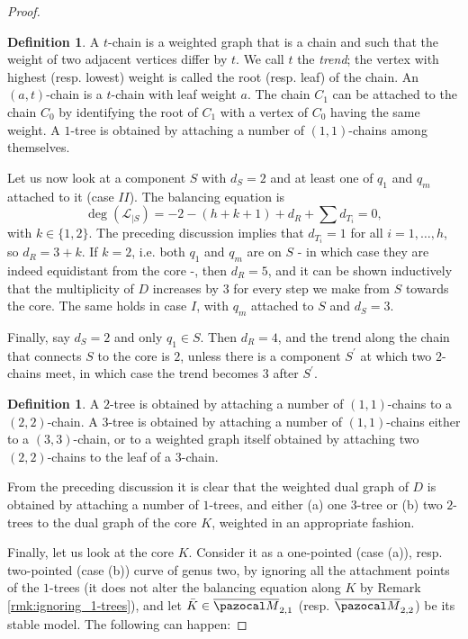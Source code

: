 \documentclass[11pt]{amsart}
\newcommand{\oM}{\overline{\pazocal M}}
\theoremstyle{plain}
\theoremstyle{definition}
\newtheorem{dfn}[thm]{Definition}
\begin{document}
\begin{proof}
\begin{dfn}
 A $t$-chain is a weighted graph that is a chain and such that the weight of two adjacent vertices differ by $t$. We call $t$ the \emph{trend}; the vertex with highest (resp. lowest) weight is called the root (resp. leaf) of the chain. An $(a,t)$-chain is a $t$-chain with leaf weight $a$. The chain $C_1$ can be attached to the chain $C_0$ by identifying the root of $C_1$ with a vertex of $C_0$ having the same weight. A $1$-tree is obtained by attaching a number of $(1,1)$-chains among themselves.
\end{dfn}

Let us now look at a component $S$ with $d_S=2$ and at least one of $q_1$ and $q_m$ attached to it (case $I\!I$). The balancing equation is
\[\deg(\mathcal L_{|S})= -2-(h+k+1)+d_R+\sum d_{T_i}=0,\]
with $k\in\{1,2\}$. The preceding discussion implies that $d_{T_i}=1$ for all $i=1,\ldots,h$, so $d_R=3+k$. If $k=2$, i.e. both $q_1$ and $q_m$ are on $S$ - in which case they are indeed equidistant from the core -, then $d_R=5$, and it can be shown inductively that the multiplicity of $D$ increases by $3$ for every step we make from $S$ towards the core. The same holds in case $I$, with $q_m$ attached to $S$ and $d_S=3$.

Finally, say $d_S=2$ and only $q_1\in S$. Then $d_R=4$, and the trend along the chain that connects $S$ to the core is $2$, unless there is a component $S^\prime$ at which two $2$-chains meet, in which case the trend becomes $3$ after $S^\prime$.

\begin{dfn}
 A $2$-tree is obtained by attaching a number of $(1,1)$-chains to a $(2,2)$-chain. A $3$-tree is obtained by attaching a number of $(1,1)$-chains either to a $(3,3)$-chain, or to a weighted graph itself obtained by attaching two $(2,2)$-chains to the leaf of a $3$-chain.
\end{dfn}

From the preceding discussion it is clear that the weighted dual graph of $D$ is obtained by attaching a number of $1$-trees, and either (a) one $3$-tree or (b) two $2$-trees to the dual graph of the core $K$, weighted in an appropriate fashion.

Finally, let us look at the core $K$. Consider it as a one-pointed (case (a)), resp. two-pointed (case (b)) curve of genus two, by ignoring all the attachment points of the $1$-trees (it does not alter the balancing equation along $K$ by Remark \ref{rmk:ignoring_1-trees}), and let $\bar K\in\oM_{2,1}$ (resp. $\oM_{2,2}$) be its stable model. The following can happen:


\end{proof}
\end{document}

